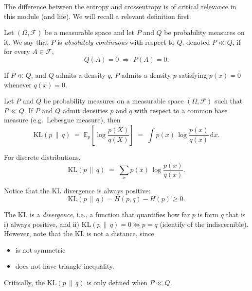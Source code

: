 The difference between the entropy and crossentropy is of critical relevance in this module (and life). We will recall a relevant definition first. 

\begin{definition}
Let $(\Omega,\mathcal{F})$ be a measurable space and let $P$ and $Q$ be probability measures on it.
We say that $P$ is \emph{absolutely continuous} with respect to $Q$, denoted $P \ll Q$,
if for every $A \in \mathcal{F}$,
\[
Q(A)=0 \;\Longrightarrow\; P(A)=0.
\]
\end{definition}

\begin{remark}
If $P \ll Q$, and $Q$ admits a density $q$, $P$ admits a density $p$
satisfying $p(x)=0$ whenever $q(x)=0$.
\end{remark}

\begin{definition}
Let $P$ and $Q$ be probability measures on a measurable space $(\Omega,\mathcal{F})$ such that $P \ll Q$. 
If $P$ and $Q$ admit densities $p$ and $q$ with respect to a common base measure
(e.g.\ Lebesgue measure), then
\[
\mathrm{KL}(p \,\|\, q)
\;=\;
\mathbb{E}_{p}\!\left[\log \frac{p(X)}{q(X)}\right]
\;=\;
\int p(x)\,\log\frac{p(x)}{q(x)}\,\mathrm{d}x.
\]
\end{definition}


\begin{definition}
For discrete distributions,
\[
\mathrm{KL}(p \,\|\, q)
\;=\;
\sum_x p(x)\,\log\frac{p(x)}{q(x)}.
\]
\end{definition}

\begin{remark}
	Notice that the KL divergence is always positive:
	\begin{equation}
		\mathrm{KL}(p \,\|\, q) = H(p,q) - H(p) \geq 0.
	\end{equation}
\end{remark}

The KL is a \emph{divergence}, i.e., a function that quantifies how far $p$ is form $q$ that is i) always positive, and ii) $\mathrm{KL}(p \,\|\, q) = 0 \iff p=q$ (identify of the indiscernible). However, note that the KL is not a distance, since 
\begin{itemize}
	\item is not symmetric
	\item does not have triangle inequality.
\end{itemize}
Critically, the $\mathrm{KL}(p \,\|\, q)$ is only defined when $P \ll Q$. 

